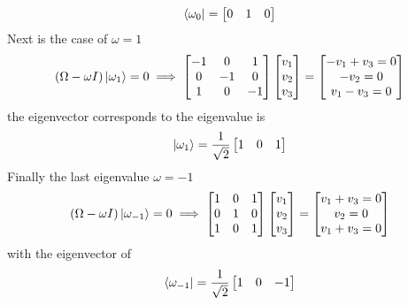 \documentclass[../main.tex]{subfiles}
\begin{document}
\begin{equation*}
	\bra{\omega_0}=
	\begin{bmatrix}
		0 & 1 & 0 \\
	\end{bmatrix}
\end{equation*}
Next is the case of $\omega=1$
\begin{equation*}
	(\Omega-\omega I)\ket{\omega_1}=0\implies
	\begin{bmatrix}
		-1 & 0  & 1  \\
		0  & -1 & 0  \\
		1  & 0  & -1 \\
	\end{bmatrix}
	\begin{bmatrix}
		v_1 \\
		v_2 \\
		v_3 \\
	\end{bmatrix}
	=
	\begin{bmatrix}
		-v_1+v_3=0 \\
		-v_2=0     \\
		v_1-v_3=0
	\end{bmatrix}
\end{equation*}
the eigenvector corresponds to the eigenvalue is
\begin{equation*}
	\ket{\omega_1}=\frac{1}{\sqrt{2}}
	\begin{bmatrix}
		1 & 0 & 1
	\end{bmatrix}
\end{equation*}
Finally the last eigenvalue $\omega=-1$
\begin{equation*}
	(\Omega-\omega I)\ket{\omega_{-1}}=0\implies
	\begin{bmatrix}
		1 & 0 & 1 \\
		0 & 1 & 0 \\
		1 & 0 & 1 \\
	\end{bmatrix}
	\begin{bmatrix}
		v_1 \\
		v_2 \\
		v_3 \\
	\end{bmatrix}
	=
	\begin{bmatrix}
		v_1+v_3=0 \\
		v_2=0     \\
		v_1+v_3=0
	\end{bmatrix}
\end{equation*}
with the eigenvector of
\begin{equation*}
	\bra{\omega_{-1}}=\frac{1}{\sqrt{2}}
	\begin{bmatrix}
		1 & 0 & -1
	\end{bmatrix}
\end{equation*}
\end{document}
